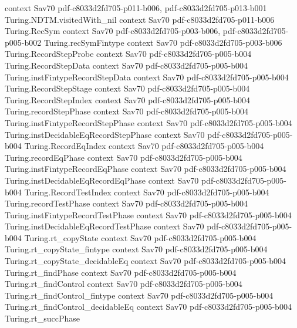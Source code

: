 \begin{theorem}
  {context}
  {Sav70}
  {pdf-c8033d2fd705-p011-b006,
    pdf-c8033d2fd705-p013-b001}
\proofstep
  {Turing.NDTM.visitedWith_nil}
  {context}
  {Sav70}
  {pdf-c8033d2fd705-p011-b006}
\proofstep
  {Turing.RecSym}
  {context}
  {Sav70}
  {pdf-c8033d2fd705-p003-b006,
    pdf-c8033d2fd705-p005-b002}
\proofstep
  {Turing.recSymFintype}
  {context}
  {Sav70}
  {pdf-c8033d2fd705-p003-b006}
\proofstep
  {Turing.RecordStepProbe}
  {context}
  {Sav70}
  {pdf-c8033d2fd705-p005-b004}
\proofstep
  {Turing.RecordStepData}
  {context}
  {Sav70}
  {pdf-c8033d2fd705-p005-b004}
\proofstep
  {Turing.instFintypeRecordStepData}
  {context}
  {Sav70}
  {pdf-c8033d2fd705-p005-b004}
\proofstep
  {Turing.RecordStepStage}
  {context}
  {Sav70}
  {pdf-c8033d2fd705-p005-b004}
\proofstep
  {Turing.RecordStepIndex}
  {context}
  {Sav70}
  {pdf-c8033d2fd705-p005-b004}
\proofstep
  {Turing.recordStepPhase}
  {context}
  {Sav70}
  {pdf-c8033d2fd705-p005-b004}
\proofstep
  {Turing.instFintypeRecordStepPhase}
  {context}
  {Sav70}
  {pdf-c8033d2fd705-p005-b004}
\proofstep
  {Turing.instDecidableEqRecordStepPhase}
  {context}
  {Sav70}
  {pdf-c8033d2fd705-p005-b004}
\proofstep
  {Turing.RecordEqIndex}
  {context}
  {Sav70}
  {pdf-c8033d2fd705-p005-b004}
\proofstep
  {Turing.recordEqPhase}
  {context}
  {Sav70}
  {pdf-c8033d2fd705-p005-b004}
\proofstep
  {Turing.instFintypeRecordEqPhase}
  {context}
  {Sav70}
  {pdf-c8033d2fd705-p005-b004}
\proofstep
  {Turing.instDecidableEqRecordEqPhase}
  {context}
  {Sav70}
  {pdf-c8033d2fd705-p005-b004}
\proofstep
  {Turing.RecordTestIndex}
  {context}
  {Sav70}
  {pdf-c8033d2fd705-p005-b004}
\proofstep
  {Turing.recordTestPhase}
  {context}
  {Sav70}
  {pdf-c8033d2fd705-p005-b004}
\proofstep
  {Turing.instFintypeRecordTestPhase}
  {context}
  {Sav70}
  {pdf-c8033d2fd705-p005-b004}
\proofstep
  {Turing.instDecidableEqRecordTestPhase}
  {context}
  {Sav70}
  {pdf-c8033d2fd705-p005-b004}
\proofstep
  {Turing.rt_copyState}
  {context}
  {Sav70}
  {pdf-c8033d2fd705-p005-b004}
\proofstep
  {Turing.rt_copyState_fintype}
  {context}
  {Sav70}
  {pdf-c8033d2fd705-p005-b004}
\proofstep
  {Turing.rt_copyState_decidableEq}
  {context}
  {Sav70}
  {pdf-c8033d2fd705-p005-b004}
\proofstep
  {Turing.rt_findPhase}
  {context}
  {Sav70}
  {pdf-c8033d2fd705-p005-b004}
\proofstep
  {Turing.rt_findControl}
  {context}
  {Sav70}
  {pdf-c8033d2fd705-p005-b004}
\proofstep
  {Turing.rt_findControl_fintype}
  {context}
  {Sav70}
  {pdf-c8033d2fd705-p005-b004}
\proofstep
  {Turing.rt_findControl_decidableEq}
  {context}
  {Sav70}
  {pdf-c8033d2fd705-p005-b004}
\proofstep
  {Turing.rt_succPhase}

\end{theorem}

